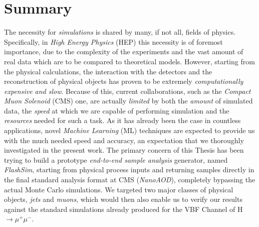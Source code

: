 \begingroup
\let\clearpage\relax
\let\cleardoublepage\relax
\let\cleardoublepage\relax

\chapter*{Summary}
The necessity for \emph{simulations} is shared by many, if not all, fields of physics. Specifically, in \emph{High Energy Physics} (HEP) this necessity is of foremost importance, due to the complexity of the experiments and the vast amount of real data which are to be compared to theoretical models. However, starting from the physical calculations, the interaction with the detectors and the reconstruction of physical objects has proven to be extremely \emph{computationally expensive and slow}. Because of this, current collaborations, such as the \emph{Compact Muon Solenoid} (CMS) one, are actually \emph{limited} by both the \emph{amount} of simulated data, the \emph{speed} at which we are capable of performing simulation and the \emph{resources} needed for such a task. As it has already been the case in countless applications, novel \emph{Machine Learning} (ML) techniques are expected to provide us with the much needed speed and accuracy, an expectation that we thoroughly investigated in the present work. The primary concern of this Thesis has been trying to build a prototype \emph{end-to-end sample analysis} generator, named \emph{FlashSim}, starting from physical process inputs and returning samples directly in the final standard analysis format at CMS (\emph{NanoAOD}), completely bypassing the actual Monte Carlo simulations. We targeted two major classes of physical objects, \emph{jets} and \emph{muons}, which would then also enable us to verify our results against the standard simulations already produced for the VBF Channel of H$\rightarrow\mu^+\mu^-$.


